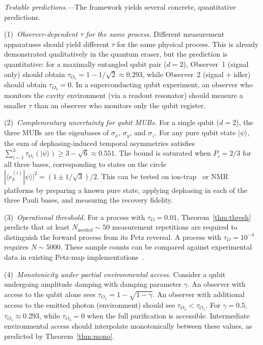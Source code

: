 \documentclass[prl,twocolumn,superscriptaddress,longbibliography,floatfix]{revtex4-2}
\newcommand{\ket}[1]{|#1\rangle}
\newcommand{\braket}[2]{\langle#1|#2\rangle}
\newcommand{\tauasym}{\tau}
\begin{document}
\emph{Testable predictions.}---The framework yields several
concrete, quantitative predictions.

(1)~\emph{Observer-dependent $\tauasym$ for the same process.}
Different measurement apparatuses should yield different
$\tauasym$ for the same physical process.  This is already
demonstrated qualitatively in the quantum eraser, but the
prediction is quantitative: for a maximally entangled qubit pair
($d=2$), Observer~1 (signal only) should obtain
$\tauasym_{O_1} = 1 - 1/\sqrt{2} \approx 0.293$, while
Observer~2 (signal $+$ idler) should obtain
$\tauasym_{O_2} = 0$.  In a superconducting qubit experiment,
an observer who monitors the cavity environment (via a readout
resonator) should measure a smaller $\tauasym$ than an observer
who monitors only the qubit register.

(2)~\emph{Complementary uncertainty for qubit MUBs.}
For a single qubit ($d=2$), the three MUBs are the eigenbases
of $\sigma_x$, $\sigma_y$, and $\sigma_z$.  For any pure qubit
state $\ket{\psi}$, the sum of dephasing-induced temporal
asymmetries satisfies
$\sum_{i=1}^{3} \tauasym_{O_i}(\ket{\psi}) \geq 3 - \sqrt{6}
\approx 0.551$.  The bound is saturated when
$P_i = 2/3$ for all three bases, corresponding to states on the
circle $|\braket{e_k^{(i)}}{\psi}|^2 = (1 \pm 1/\sqrt{3})/2$.
This can be tested on ion-trap~\cite{Png2025} or
NMR~\cite{Singh2025} platforms by preparing a known pure state,
applying dephasing in each of the three Pauli bases, and
measuring the recovery fidelity.

(3)~\emph{Operational threshold.}
For a process with $\tauasym_O = 0.01$, Theorem~\ref{thm:thresh}
predicts that at least $N_{\mathrm{needed}} \sim 50$
measurement repetitions are required to distinguish the forward
process from its Petz reversal.  A process with
$\tauasym_O = 10^{-4}$ requires $N \sim 5000$.  These sample
counts can be compared against experimental data in existing
Petz-map implementations~\cite{Png2025,Singh2025}.

(4)~\emph{Monotonicity under partial environmental access.}
Consider a qubit undergoing amplitude damping with damping
parameter $\gamma$.  An observer with access to the qubit alone
sees $\tauasym_{O_1} = 1 - \sqrt{1-\gamma}$.  An observer with
additional access to the emitted photon (environment) should see
$\tauasym_{O_2} < \tauasym_{O_1}$.  For $\gamma = 0.5$,
$\tauasym_{O_1} \approx 0.293$, while $\tauasym_{O_2} = 0$
when the full purification is accessible.  Intermediate
environmental access should interpolate monotonically between
these values, as predicted by Theorem~\ref{thm:mono}.
\end{document}
